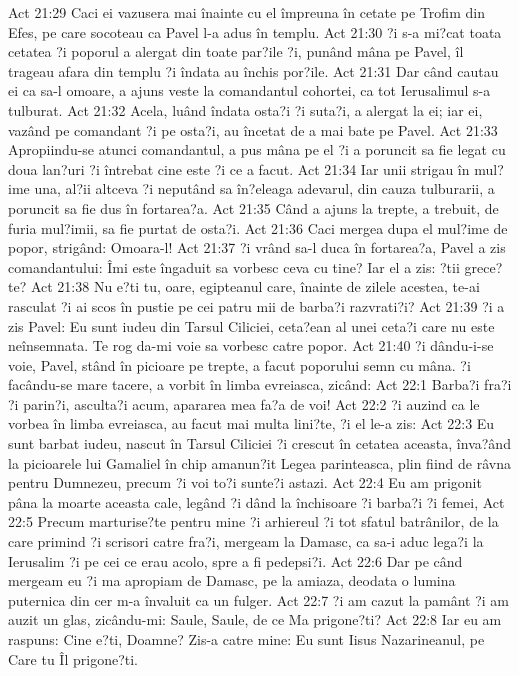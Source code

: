 Act 21:29  Caci ei vazusera mai înainte cu el împreuna în cetate pe Trofim din Efes, pe care socoteau ca Pavel l-a adus în templu.
Act 21:30  ?i s-a mi?cat toata cetatea ?i poporul a alergat din toate par?ile ?i, punând mâna pe Pavel, îl trageau afara din templu ?i îndata au închis por?ile.
Act 21:31  Dar când cautau ei ca sa-l omoare, a ajuns veste la comandantul cohortei, ca tot Ierusalimul s-a tulburat.
Act 21:32  Acela, luând îndata osta?i ?i suta?i, a alergat la ei; iar ei, vazând pe comandant ?i pe osta?i, au încetat de a mai bate pe Pavel.
Act 21:33  Apropiindu-se atunci comandantul, a pus mâna pe el ?i a poruncit sa fie legat cu doua lan?uri ?i întrebat cine este ?i ce a facut.
Act 21:34  Iar unii strigau în mul?ime una, al?ii altceva ?i neputând sa în?eleaga adevarul, din cauza tulburarii, a poruncit sa fie dus în fortarea?a.
Act 21:35  Când a ajuns la trepte, a trebuit, de furia mul?imii, sa fie purtat de osta?i.
Act 21:36  Caci mergea dupa el mul?ime de popor, strigând: Omoara-l!
Act 21:37  ?i vrând sa-l duca în fortarea?a, Pavel a zis comandantului: Îmi este îngaduit sa vorbesc ceva cu tine? Iar el a zis: ?tii grece?te?
Act 21:38  Nu e?ti tu, oare, egipteanul care, înainte de zilele acestea, te-ai rasculat ?i ai scos în pustie pe cei patru mii de barba?i razvrati?i?
Act 21:39  ?i a zis Pavel: Eu sunt iudeu din Tarsul Ciliciei, ceta?ean al unei ceta?i care nu este neînsemnata. Te rog da-mi voie sa vorbesc catre popor.
Act 21:40  ?i dându-i-se voie, Pavel, stând în picioare pe trepte, a facut poporului semn cu mâna. ?i facându-se mare tacere, a vorbit în limba evreiasca, zicând:
Act 22:1  Barba?i fra?i ?i parin?i, asculta?i acum, apararea mea fa?a de voi!
Act 22:2  ?i auzind ca le vorbea în limba evreiasca, au facut mai multa lini?te, ?i el le-a zis:
Act 22:3  Eu sunt barbat iudeu, nascut în Tarsul Ciliciei ?i crescut în cetatea aceasta, înva?ând la picioarele lui Gamaliel în chip amanun?it Legea parinteasca, plin fiind de râvna pentru Dumnezeu, precum ?i voi to?i sunte?i astazi.
Act 22:4  Eu am prigonit pâna la moarte aceasta cale, legând ?i dând la închisoare ?i barba?i ?i femei,
Act 22:5  Precum marturise?te pentru mine ?i arhiereul ?i tot sfatul batrânilor, de la care primind ?i scrisori catre fra?i, mergeam la Damasc, ca sa-i aduc lega?i la Ierusalim ?i pe cei ce erau acolo, spre a fi pedepsi?i.
Act 22:6  Dar pe când mergeam eu ?i ma apropiam de Damasc, pe la amiaza, deodata o lumina puternica din cer m-a învaluit ca un fulger.
Act 22:7  ?i am cazut la pamânt ?i am auzit un glas, zicându-mi: Saule, Saule, de ce Ma prigone?ti?
Act 22:8  Iar eu am raspuns: Cine e?ti, Doamne? Zis-a catre mine: Eu sunt Iisus Nazarineanul, pe Care tu Îl prigone?ti.
